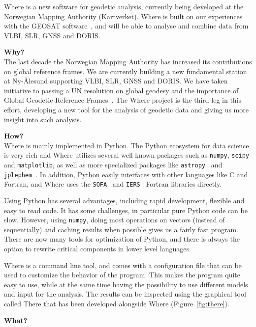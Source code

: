 Where is a new software for geodetic analysis, currently being developed at the
Norwegian Mapping Authority (Kartverket). Where is built on our experiences with
the GEOSAT software~\cite{kierulf2010}, and will be able to analyse and combine
data from VLBI, SLR, GNSS and DORIS.


{\large\bfseries Why?}\\

The last decade the Norwegian Mapping Authority has increased its contributions
on global reference frames.  We are currently building a new fundamental station
at Ny-{\AA}lesund supporting VLBI, SLR, GNSS and DORIS. We have taken initiative
to passing a UN resolution on global geodesy and the importance of Global
Geodetic Reference Frames~\cite{un_ggrf}. The Where project is the third leg in
this effort, developing a new tool for the analysis of geodetic data and giving
us more insight into such analysis.


{\large\bfseries How?}\\

Where is mainly implemented in Python. The Python ecosystem for data science is
very rich and Where utilizes several well known packages such
as \texttt{numpy}, \texttt{scipy} and \texttt{matplotlib}, as well as more
specialized packages like \texttt{astropy}~\cite{astropy2013}
and \texttt{jplephem}~\cite{jplephem}. In addition, Python easily interfaces
with other languages like C and Fortran, and Where uses
the \texttt{SOFA}~\cite{sofa_software} and \texttt{IERS}~\cite{iers_software}
Fortran libraries directly.

Using Python has several advantages, including rapid development, flexible and
easy to read code. It has some challenges, in particular pure Python code can be
slow. However, using \texttt{numpy}, doing most operations on vectors (instead
of sequentially) and caching results when possible gives us a fairly fast
program. There are now many tools for optimization of Python, and there is always
the option to rewrite critical components in lower level languages.

Where is a command line tool, and comes with a configuration file that can be
used to customize the behavior of the program. This makes the program quite easy
to use, while at the same time having the possibility to use different models
and input for the analysis. The results can be inspected using the graphical
tool called There that has been developed alongside Where (Figure~\ref{fig:there}).


{\large\bfseries What?}\\

